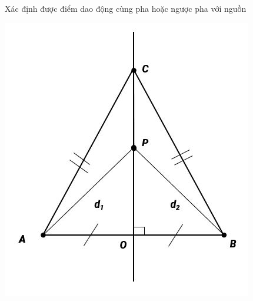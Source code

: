 \begin{dang}{Xác định được điểm dao động cùng pha hoặc ngược pha với nguồn}
{\begin{center}
			\vspace*{1em}
			\includegraphics[scale=0.6]{../figs/VN12-PH-11-A-007-2-V2-1.JPG}
		\end{center}
		
}
\end{dang}

